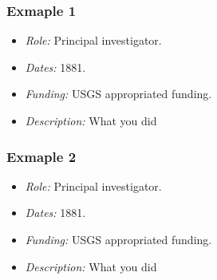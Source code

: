 \subsubsection{Exmaple 1} \label{project1}

\begin{itemize}
\item \textit{Role:}
 Principal investigator.
\item \textit{Dates:} 1881.
\item \textit{Funding:} USGS appropriated funding.
\item \textit{Description:} What you did
\end{itemize}

\subsubsection{Exmaple 2} \label{project2}

\begin{itemize}
\item \textit{Role:}
 Principal investigator.
\item \textit{Dates:} 1881.
\item \textit{Funding:} USGS appropriated funding.
\item \textit{Description:} What you did
\end{itemize}